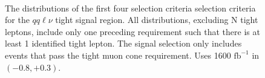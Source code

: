 \begin{figure}[htpb]
\begin{minipage}{0.49\textwidth}
     \end{minipage}\\
     	
     	\caption{ The distributions of the first four selection criteria selection criteria for the $qq\ell\nu$ tight signal region. All distributions, excluding N tight leptons, include only one preceding requirement such that there is at least 1 identified tight lepton. The signal selection only includes events that pass the tight muon cone requirement. Uses 1600 $\text{fb}^{-1}$ in $(-0.8,+0.3)$.}
     	\label{fig:cutflow}

     \end{figure}

